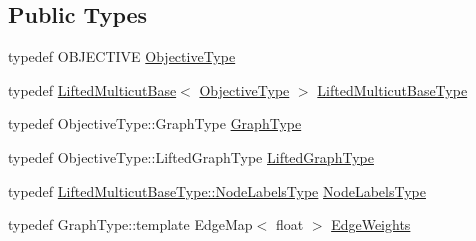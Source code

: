 \subsection*{Public Types}
\begin{DoxyCompactItemize}
\item 
typedef O\+B\+J\+E\+C\+T\+I\+V\+E \hyperlink{classnifty_1_1graph_1_1optimization_1_1lifted__multicut_1_1WatershedProposalGenerator_a6d15e32fd68f785c92ee9ee909e84a4d}{Objective\+Type}
\item 
typedef \hyperlink{classnifty_1_1graph_1_1optimization_1_1lifted__multicut_1_1LiftedMulticutBase}{Lifted\+Multicut\+Base}$<$ \hyperlink{classnifty_1_1graph_1_1optimization_1_1lifted__multicut_1_1WatershedProposalGenerator_a6d15e32fd68f785c92ee9ee909e84a4d}{Objective\+Type} $>$ \hyperlink{classnifty_1_1graph_1_1optimization_1_1lifted__multicut_1_1WatershedProposalGenerator_a8bc07006f85d4302673522c0cfc07e3e}{Lifted\+Multicut\+Base\+Type}
\item 
typedef Objective\+Type\+::\+Graph\+Type \hyperlink{classnifty_1_1graph_1_1optimization_1_1lifted__multicut_1_1WatershedProposalGenerator_a4ead35b918fb664a16c37f19e2831bd9}{Graph\+Type}
\item 
typedef Objective\+Type\+::\+Lifted\+Graph\+Type \hyperlink{classnifty_1_1graph_1_1optimization_1_1lifted__multicut_1_1WatershedProposalGenerator_ab426f6e7d5adb0ddeb47ec815c247609}{Lifted\+Graph\+Type}
\item 
typedef \hyperlink{classnifty_1_1graph_1_1optimization_1_1common_1_1SolverBase_a6e4e465f3b6e039882669fcfb9714818}{Lifted\+Multicut\+Base\+Type\+::\+Node\+Labels\+Type} \hyperlink{classnifty_1_1graph_1_1optimization_1_1lifted__multicut_1_1WatershedProposalGenerator_a9b84800a88ae0384cf729f345d7834da}{Node\+Labels\+Type}
\item 
typedef Graph\+Type\+::template Edge\+Map$<$ float $>$ \hyperlink{classnifty_1_1graph_1_1optimization_1_1lifted__multicut_1_1WatershedProposalGenerator_ad31d23bf9c7d159ddb3f447d763764a8}{Edge\+Weights}
\end{DoxyCompactItemize}
